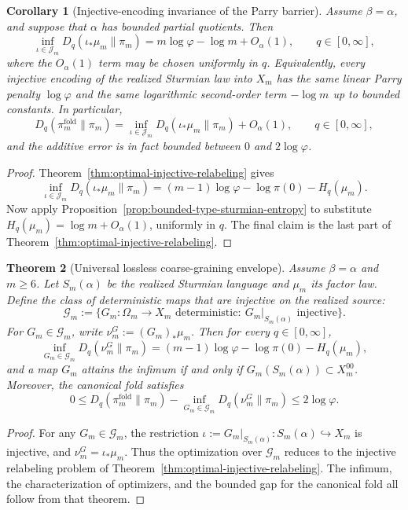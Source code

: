 \documentclass[11pt,letterpaper]{article}
\numberwithin{equation}{section}
\theoremstyle{plain}
\newtheorem{theorem}{Theorem}[section]
\newtheorem{corollary}[theorem]{Corollary}
\theoremstyle{definition}
\theoremstyle{remark}
\begin{document}
\begin{corollary}[Injective-encoding invariance of the Parry barrier]
\label{cor:injective-relabeling-bounded-type}
Assume \(\beta=\alpha\), and suppose that \(\alpha\) has bounded partial
quotients. Then
\[
\inf_{\iota\in\mathcal J_m}D_q(\iota_*\mu_m\|\pi_m)
=
m\log\varphi-\log m+O_\alpha(1),
\qquad q\in[0,\infty],
\]
where the \(O_\alpha(1)\) term may be chosen uniformly in \(q\). Equivalently,
every injective encoding of the realized Sturmian law into \(X_m\) has the same
linear Parry penalty \(\log\varphi\) and the same logarithmic second-order term
\(-\log m\) up to bounded constants. In particular,
\[
D_q(\pi_m^{\mathrm{fold}}\|\pi_m)
=
\inf_{\iota\in\mathcal J_m}D_q(\iota_*\mu_m\|\pi_m)+O_\alpha(1),
\qquad q\in[0,\infty],
\]
and the additive error is in fact bounded between \(0\) and \(2\log\varphi\).
\end{corollary}

\begin{proof}
Theorem~\ref{thm:optimal-injective-relabeling} gives
\[
\inf_{\iota\in\mathcal J_m}D_q(\iota_*\mu_m\|\pi_m)
=
(m-1)\log\varphi-\log\pi(0)-H_q(\mu_m).
\]
Now apply Proposition~\ref{prop:bounded-type-sturmian-entropy} to substitute
\(H_q(\mu_m)=\log m+O_\alpha(1)\), uniformly in \(q\). The final claim is the
last part of Theorem~\ref{thm:optimal-injective-relabeling}.
\end{proof}

\begin{theorem}[Universal lossless coarse-graining envelope]
\label{thm:lossless-coarse-graining-envelope}
Assume \(\beta=\alpha\) and \(m\ge 6\). Let \(S_m(\alpha)\) be the realized
Sturmian language and \(\mu_m\) its factor law. Define the class of
deterministic maps that are injective on the realized source:
\[
\mathcal G_m
:=
\{G_m:\Omega_m\to X_m \text{ deterministic}:\
G_m|_{S_m(\alpha)}\text{ injective}\}.
\]
For \(G_m\in\mathcal G_m\), write
\(\nu_m^G:=(G_m)_*\mu_m\). Then for every \(q\in[0,\infty]\),
\[
\inf_{G_m\in\mathcal G_m}D_q(\nu_m^G\|\pi_m)
=
(m-1)\log\varphi-\log\pi(0)-H_q(\mu_m),
\]
and a map \(G_m\) attains the infimum if and only if
\(G_m(S_m(\alpha))\subset X_m^{00}\). Moreover, the canonical fold satisfies
\[
0\le D_q(\pi_m^{\mathrm{fold}}\|\pi_m)
-\inf_{G_m\in\mathcal G_m}D_q(\nu_m^G\|\pi_m)
\le 2\log\varphi.
\]
\end{theorem}

\begin{proof}
For any \(G_m\in\mathcal G_m\), the restriction
\(\iota:=G_m|_{S_m(\alpha)}:S_m(\alpha)\hookrightarrow X_m\) is injective, and
\(\nu_m^G=\iota_*\mu_m\). Thus the optimization over \(\mathcal G_m\) reduces
to the injective relabeling problem of
Theorem~\ref{thm:optimal-injective-relabeling}. The infimum, the
characterization of optimizers, and the bounded gap for the canonical fold all
follow from that theorem.
\end{proof}
\end{document}
